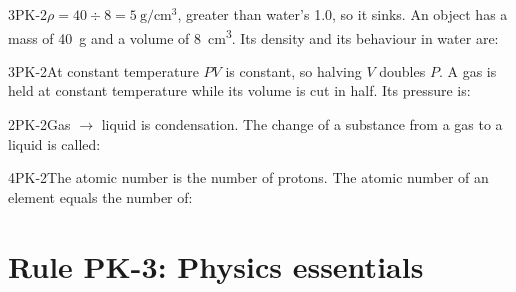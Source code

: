 \documentclass[11pt]{article}
\begin{document}
\begin{q}{3}{PK-2}{$\rho = 40 \div 8 = \SI{5}{\gram\per\centi\metre\cubed}$, greater than water's 1.0, so it sinks.}
An object has a mass of \SI{40}{\gram} and a volume of \SI{8}{\centi\metre\cubed}. Its density and its behaviour in water are:
\end{q}

\begin{q}{3}{PK-2}{At constant temperature $PV$ is constant, so halving $V$ doubles $P$.}
A gas is held at constant temperature while its volume is cut in half. Its pressure is:
\end{q}

\begin{q}{2}{PK-2}{Gas $\to$ liquid is condensation.}
The change of a substance from a gas to a liquid is called:
\end{q}

\begin{q}{4}{PK-2}{The atomic number is the number of protons.}
The atomic number of an element equals the number of:
\end{q}

\section{Rule PK-3: Physics essentials}
\end{document}
